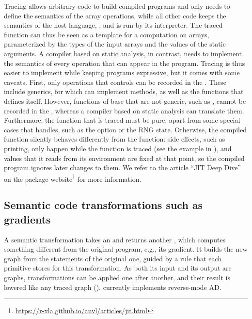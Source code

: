 \documentclass[article,shortnames]{jss}
\begin{document}
Tracing allows arbitrary  code to build compiled programs and only needs to define the semantics of the array operations, while all other code keeps the semantics of the host language, , and is run by its interpreter.
The traced  function can thus be seen as a template for a computation on arrays, parameterized by the types of the input arrays and the values of the static arguments.
A compiler based on static analysis, in contrast, needs to implement the semantics of every operation that can appear in the program.
Tracing is thus easier to implement while keeping programs expressive, but it comes with some caveats.
First, only operations that  controls can be recorded in the .
These include  generics, for which  can implement methods, as well as the functions that  defines itself.
However, functions of base  that are not generic, such as , cannot be recorded in the , whereas a compiler based on static analysis can translate them.
Furthermore, the function that is traced must be pure, apart from some special cases that  handles, such as the option  or the RNG state.
Otherwise, the compiled function silently behaves differently from the  function: side effects, such as printing, only happen while the function is traced (see the example in ), and values that it reads from its environment are fixed at that point, so the compiled program ignores later changes to them.
We refer to the article ``JIT Deep Dive'' on the package website\footnote{\url{https://r-xla.github.io/anvl/articles/jit.html}} for more information.

\subsection{Semantic code transformations such as gradients}\label{ad}

A semantic transformation takes an  and returns another , which computes something different from the original program, e.g., its gradient.
It builds the new graph from the statements of the original one, guided by a rule that each primitive stores for this transformation.
As both its input and its output are graphs, transformations can be applied one after another, and their result is lowered like any traced graph ().
 currently implements reverse-mode AD.
\end{document}
